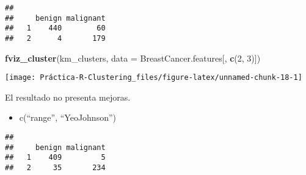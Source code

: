 \documentclass[]{article}
\newenvironment{Shaded}{\begin{snugshade}}{\end{snugshade}}
\newcommand{\CommentTok}[1]{\textcolor[rgb]{0.56,0.35,0.01}{\textit{#1}}}
\newcommand{\DataTypeTok}[1]{\textcolor[rgb]{0.13,0.29,0.53}{#1}}
\newcommand{\DecValTok}[1]{\textcolor[rgb]{0.00,0.00,0.81}{#1}}
\newcommand{\KeywordTok}[1]{\textcolor[rgb]{0.13,0.29,0.53}{\textbf{#1}}}
\newcommand{\NormalTok}[1]{#1}
\newcommand{\OperatorTok}[1]{\textcolor[rgb]{0.81,0.36,0.00}{\textbf{#1}}}
\newcommand{\StringTok}[1]{\textcolor[rgb]{0.31,0.60,0.02}{#1}}
\providecommand{\tightlist}{%
  \setlength{\itemsep}{0pt}\setlength{\parskip}{0pt}}
\begin{document}
\begin{verbatim}
##    
##     benign malignant
##   1    440        60
##   2      4       179
\end{verbatim}

\begin{Shaded}
\begin{Highlighting}[]
\KeywordTok{fviz_cluster}\NormalTok{(km_clusters, }\DataTypeTok{data =}\NormalTok{ BreastCancer.features[, }\KeywordTok{c}\NormalTok{(}\DecValTok{2}\NormalTok{, }\DecValTok{3}\NormalTok{)])}
\end{Highlighting}
\end{Shaded}

\begin{center}\texttt{[image: Práctica-R-Clustering\_files/figure-latex/unnamed-chunk-18-1]} \end{center}

El resultado no presenta mejoras.

\begin{itemize}
\tightlist
\item
  c(``range'', ``YeoJohnson'')
\end{itemize}

\begin{Shaded}
\end{Shaded}

\begin{verbatim}
##    
##     benign malignant
##   1    409         5
##   2     35       234
\end{verbatim}
\end{document}
